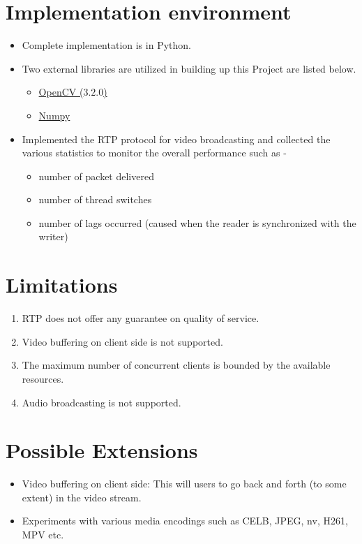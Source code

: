\documentclass[a4paper]{article}
\begin{document}
  \section{Implementation environment}
    \begin{itemize}
      \item Complete implementation is in Python.
      \item Two external libraries are utilized in building up this Project are listed below.
      \begin{itemize}
        \item \href{https://docs.opencv.org/2.4/doc/tutorials/tutorials.html} {OpenCV ($3.2.0$)}
        \item \href{https://docs.scipy.org/doc/} {Numpy}
      \end{itemize}
      \item Implemented the RTP protocol for video broadcasting and collected the various statistics to monitor the overall performance such as -
      \begin{itemize}
      \item number of packet delivered
      \item number of thread switches
      \item number of lags occurred (caused when the reader is synchronized with the writer)
      \end{itemize}
    \end{itemize}

  \section{Limitations}
    \begin{enumerate}
      \item RTP does not offer any guarantee on quality of service.
      \item Video buffering on client side is not supported.
      \item The maximum number of concurrent clients is bounded by the available resources.
      \item Audio broadcasting is not supported.
    \end{enumerate}

  \section{Possible Extensions}
    \begin{itemize}
      \item Video buffering on client side: This will users to go back and forth (to some extent) in the video stream.
      \item Experiments with various media encodings such as CELB, JPEG, nv, H261, MPV etc.
    \end{itemize}
\end{document}

